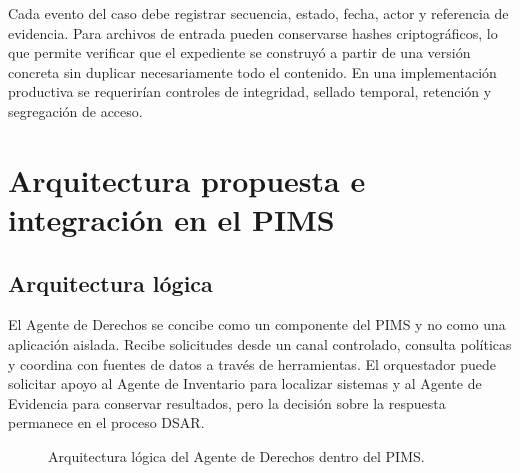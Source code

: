 \documentclass[11pt,a4paper]{article}
\begin{document}
Cada evento del caso debe registrar secuencia, estado, fecha, actor y referencia de evidencia. Para archivos de entrada pueden conservarse hashes criptográficos, lo que permite verificar que el expediente se construyó a partir de una versión concreta sin duplicar necesariamente todo el contenido. En una implementación productiva se requerirían controles de integridad, sellado temporal, retención y segregación de acceso.

\section{Arquitectura propuesta e integración en el PIMS}

\subsection{Arquitectura lógica}

El Agente de Derechos se concibe como un componente del PIMS y no como una aplicación aislada. Recibe solicitudes desde un canal controlado, consulta políticas y coordina con fuentes de datos a través de herramientas. El orquestador puede solicitar apoyo al Agente de Inventario para localizar sistemas y al Agente de Evidencia para conservar resultados, pero la decisión sobre la respuesta permanece en el proceso DSAR.

\begin{figure}[H]
\centering
{}
\caption{Arquitectura lógica del Agente de Derechos dentro del PIMS.}
\label{fig:architecture}
\end{figure}
\end{document}
